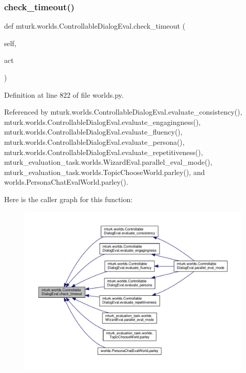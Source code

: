 \subsubsection{\texorpdfstring{check\+\_\+timeout()}{check\_timeout()}}
{\footnotesize\ttfamily def mturk.\+worlds.\+Controllable\+Dialog\+Eval.\+check\+\_\+timeout (\begin{DoxyParamCaption}\item[{}]{self,  }\item[{}]{act }\end{DoxyParamCaption})}



Definition at line 822 of file worlds.\+py.



Referenced by mturk.\+worlds.\+Controllable\+Dialog\+Eval.\+evaluate\+\_\+consistency(), mturk.\+worlds.\+Controllable\+Dialog\+Eval.\+evaluate\+\_\+engagingness(), mturk.\+worlds.\+Controllable\+Dialog\+Eval.\+evaluate\+\_\+fluency(), mturk.\+worlds.\+Controllable\+Dialog\+Eval.\+evaluate\+\_\+persona(), mturk.\+worlds.\+Controllable\+Dialog\+Eval.\+evaluate\+\_\+repetitiveness(), mturk\+\_\+evaluation\+\_\+task.\+worlds.\+Wizard\+Eval.\+parallel\+\_\+eval\+\_\+mode(), mturk\+\_\+evaluation\+\_\+task.\+worlds.\+Topic\+Choose\+World.\+parley(), and worlds.\+Persona\+Chat\+Eval\+World.\+parley().

Here is the caller graph for this function\+:
\nopagebreak
\begin{figure}[H]
\begin{center}
\leavevmode
\includegraphics[width=350pt]{classmturk_1_1worlds_1_1ControllableDialogEval_ae50fb3e9d6e7657201cbbe932d533a0d_icgraph}
\end{center}
\end{figure}
\mbox{\label{classmturk_1_1worlds_1_1ControllableDialogEval_ada3a1f3595c5e3c5aab8438609301d33}} 
